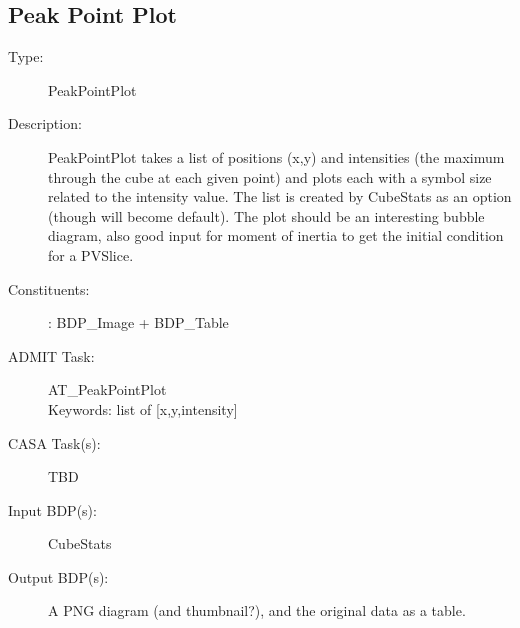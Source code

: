 \subsection{Peak Point Plot}
\begin{description}
\item[Type:] PeakPointPlot
\item[Description:]

PeakPointPlot takes a list of positions (x,y) and intensities (the maximum
through the cube at each given point) and plots each with a symbol size
related to the intensity value. The list is created by CubeStats as an option
(though will become default). The plot should be an interesting bubble diagram,
also good input for moment of inertia to get the initial condition for
a PVSlice.

\item[Constituents:]: BDP\_Image + BDP\_Table

\item[ADMIT Task:] AT\_PeakPointPlot \\
    Keywords: list of [x,y,intensity] 

\item[CASA Task(s):] TBD

\item[Input BDP(s):] CubeStats

\item[Output BDP(s):] A PNG diagram (and thumbnail?), and the
original data as a table.
\end{description}
